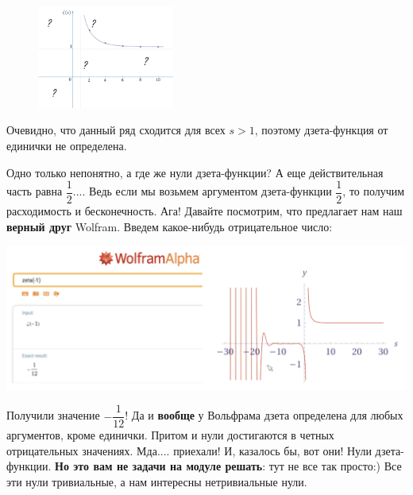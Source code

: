 \newline \hspace{20}
\begin{figure}
 \vspace{-40pt}
  \begin{center}
    \includegraphics[width=0.4\textwidth]{zeta.png}
  \end{center}
   \vspace{-60pt}
\end{figure}
\hspace{20}
Очевидно, что данный ряд сходится для всех $s>1$, поэтому дзета-функция от единички не определена.



\hspace{20}Одно только непонятно, а где же нули дзета-функции? А еще действительная часть равна $\dfrac{1}{2}$....
Ведь если мы возьмем аргументом дзета-функции $\dfrac{1}{2}$, то получим расходимость и бесконечность. Ага! Давайте посмотрим, что предлагает нам наш \textbf{верный друг} Wolfram. Введем какое-нибудь отрицательное число:


\includegraphics[width=\textwidth]{wolfram.png}




\hspace{20}Получили значение \textbf{$-\dfrac{1}{12}$}! Да и \textbf{вообще} у Вольфрама дзета определена для любых аргументов, кроме единички. Притом и нули достигаются в четных отрицательных значениях. Мда.... приехали!
И, казалось бы, вот они! Нули дзета-функции. \textbf{Но это вам не задачи на модуле решать}: тут не все так просто:) Все эти нули тривиальные, а нам интересны нетривиальные нули. 

